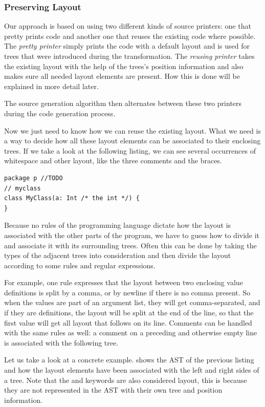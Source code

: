 \subsubsection{Preserving Layout}

Our approach is based on using two different kinds of source printers: one that pretty prints code  and another one that reuses the existing code where possible. The \textit{pretty printer} simply prints the code with a default layout and is used for trees that were introduced during the transformation. The \textit{reusing printer} takes the existing layout with the help of the trees's position information and also makes sure all needed layout elements are present. How this is done will be explained in more detail later.

The source generation algorithm then alternates between these two printers during the code generation process.

Now we just need to know how we can reuse the existing layout. What we need is a way to decide how all these layout elements can be associated to their enclosing trees. If we take a look at the following listing, we can see several occurrences of whitespace and other layout, like the three comments and the braces.

\begin{lstlisting}
package p //TODO
// myclass
class MyClass(a: Int /* the int */) {
}
\end{lstlisting}

Because no rules of the programming language dictate how the layout is associated with the other parts of the program, we have to guess how to divide it and associate it with its surrounding trees. Often this can be done by taking the types of the adjacent trees into consideration and then divide the layout according to some rules and regular expressions. 

For example, one rule expresses that the layout between two enclosing value definitions is split by a comma, or by newline if there is no comma present. So when the values are part of an argument list, they will get comma-separated, and if they are definitions, the layout will be split at the end of the line, so that the first value will get all layout that follows on its line. Comments can be handled with the same rules as well: a comment on a preceding and otherwise empty line is associated with the following tree.

Let us take a look at a concrete example.  shows the AST of the previous listing and how the layout elements have been associated with the left and right sides of a tree. Note that the  and  keywords are also considered layout, this is because they are not represented in the AST with their own tree and position information.

